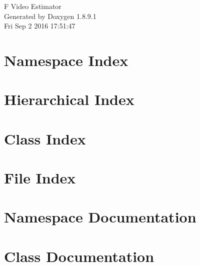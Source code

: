 \documentclass[twoside]{book}
\newcommand{\+}{\discretionary{\mbox{\scriptsize$\hookleftarrow$}}{}{}}
\newcommand{\clearemptydoublepage}{%
  \newpage{\pagestyle{empty}\cleardoublepage}%
}
\begin{document}
\hypersetup{pageanchor=false,
             bookmarks=true,
             bookmarksnumbered=true,
             pdfencoding=unicode
            }
\begin{titlepage}
\vspace*{7cm}
\begin{center}%
{\Large F Video Estimator }\\
\vspace*{1cm}
{\large Generated by Doxygen 1.8.9.1}\\
\vspace*{0.5cm}
{\small Fri Sep 2 2016 17:51:47}\\
\end{center}
\end{titlepage}
\clearemptydoublepage
\tableofcontents
\clearemptydoublepage
{}
\hypersetup{pageanchor=true}

\chapter{Namespace Index}

\chapter{Hierarchical Index}

\chapter{Class Index}

\chapter{File Index}

\chapter{Namespace Documentation}

\chapter{Class Documentation}















\end{document}

